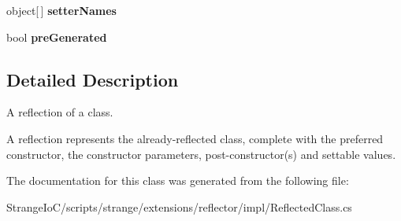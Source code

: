 \begin{DoxyCompactItemize}
\item 
\hypertarget{classstrange_1_1extensions_1_1reflector_1_1impl_1_1_reflected_class_a5b9a034f9a9ee413dd2815006f156a32}{object\mbox{[}$\,$\mbox{]} {\bfseries setter\-Names}}\label{classstrange_1_1extensions_1_1reflector_1_1impl_1_1_reflected_class_a5b9a034f9a9ee413dd2815006f156a32}

\item 
\hypertarget{classstrange_1_1extensions_1_1reflector_1_1impl_1_1_reflected_class_ab92614c2e245f4f82ff9a664518b9fec}{bool {\bfseries pre\-Generated}}\label{classstrange_1_1extensions_1_1reflector_1_1impl_1_1_reflected_class_ab92614c2e245f4f82ff9a664518b9fec}

\end{DoxyCompactItemize}


\subsection{Detailed Description}
A reflection of a class. 

A reflection represents the already-\/reflected class, complete with the preferred constructor, the constructor parameters, post-\/constructor(s) and settable values. 

The documentation for this class was generated from the following file\-:\begin{DoxyCompactItemize}
\item 
Strange\-Io\-C/scripts/strange/extensions/reflector/impl/Reflected\-Class.\-cs\end{DoxyCompactItemize}
